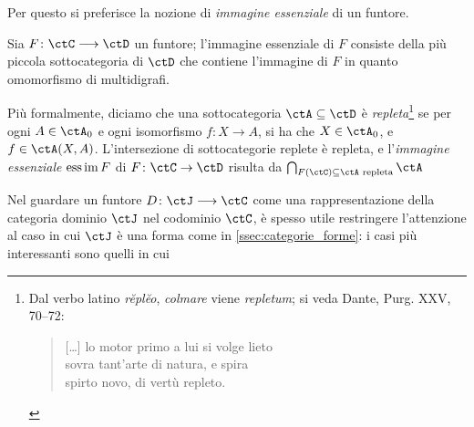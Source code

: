 Per questo si preferisce la nozione di \emph{immagine essenziale} di un funtore.
\begin{definition}\label{def_fun_imess}
 Sia \(F \colon \ctC\fun\ctD\) un funtore; l'immagine essenziale di \(F\) consiste della più piccola sottocategoria di \(\ctD\) che contiene l'immagine di \(F\) in quanto omomorfismo di multidigrafi.

 Più formalmente, diciamo che una sottocategoria \(\ctA\subseteq\ctD\) è \emph{repleta}\footnote{Dal verbo latino \emph{rĕplĕo}, \emph{colmare} viene \emph{repletum}; si veda Dante, Purg. XXV, 70--72:
  \begin{verse}
   [\dots\unkern] lo motor primo a lui si volge lieto \\
   sovra tant'arte di natura, e spira \\
   spirto novo, di vertù repleto.
  \end{verse}} se per ogni \(A\in\ctA_0\) e ogni isomorfismo \(f \colon X\to A\), si ha che \(X\in\ctA_0\), e \(f \in \Hom{\ctA}(X,A)\). L'intersezione di sottocategorie replete è repleta, e l'\emph{immagine essenziale} \(\operatorname*{ess\,im} F\) di \(F \colon \ctC\to\ctD\) risulta da \(\bigcap_{F(\ctC)\subseteq \ctA \text{ repleta}} \ctA\)
\end{definition}
Nel guardare un funtore \(D \colon \ctJ \fun\ctC\) come una rappresentazione della categoria dominio \(\ctJ\) nel codominio \(\ctC\), è spesso utile restringere l'attenzione al caso in cui \(\ctJ\) è una forma come in \ref{ssec:categorie_forme}: i casi più interessanti sono quelli in cui
